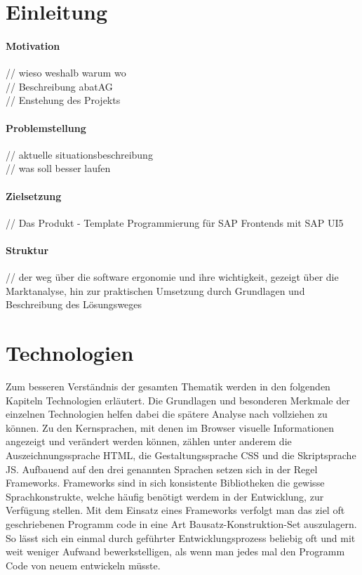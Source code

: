 \documentclass[12pt,a4paper,bibliography=totocnumbered,listof=totocnumbered]{scrartcl}
\begin{document}
\section{Einleitung}
\paragraph{Motivation}
// wieso weshalb warum wo\\
// Beschreibung abatAG\\
// Enstehung des Projekts\\

\paragraph{Problemstellung}
// aktuelle situationsbeschreibung\\
// was soll besser laufen\\

\paragraph{Zielsetzung}
// Das Produkt - Template Programmierung für SAP Frontends mit SAP UI5

\paragraph{Struktur}
// der weg über die software ergonomie und ihre wichtigkeit, gezeigt über die Marktanalyse, hin zur praktischen Umsetzung durch Grundlagen und Beschreibung des Lösungsweges\\
\pagebreak

\section{Technologien}
Zum besseren Verständnis der gesamten Thematik werden in den folgenden Kapiteln Technologien erläutert. Die Grundlagen und besonderen Merkmale der einzelnen Technologien helfen dabei die spätere Analyse nach vollziehen zu können. Zu den Kernsprachen, mit denen im Browser visuelle Informationen angezeigt und verändert werden können, zählen unter anderem die Auszeichnungssprache \ac{HTML}, die Gestaltungssprache \ac{CSS} und die Skriptsprache \ac{JS}. Aufbauend auf den drei genannten Sprachen setzen sich in der Regel Frameworks. Frameworks sind in sich konsistente Bibliotheken die gewisse Sprachkonstrukte, welche häufig benötigt werdem in der Entwicklung, zur Verfügung stellen. Mit dem Einsatz eines Frameworks verfolgt man das ziel oft geschriebenen Programm code in eine Art \glqq Bausatz-Konstruktion-Set\grqq{} auszulagern. So lässt sich ein einmal durch geführter Entwicklungsprozess beliebig oft und mit weit weniger Aufwand bewerkstelligen, als wenn man jedes mal den Programm Code von neuem entwickeln müsste.
\end{document}
